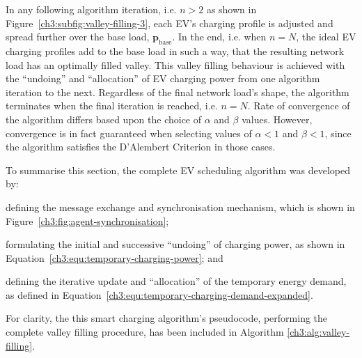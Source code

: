 In any following algorithm iteration, i.e. $n>2$ as shown in Figure~\ref{ch3:subfig:valley-filling-3}, each EV's charging profile is adjusted and spread further over the base load, $\textbf{p}_\text{base}$.
In the end, i.e. when $n=N$, the ideal EV charging profiles add to the base load in such a way, that the resulting network load has an optimally filled valley.
This valley filling behaviour is achieved with the ``undoing'' and ``allocation'' of EV charging power from one algorithm iteration to the next.
Regardless of the final network load's shape, the algorithm terminates when the final iteration is reached, i.e. $n=N$.
Rate of convergence of the algorithm differs based upon the choice of $\alpha$ and $\beta$ values.
However, convergence is in fact guaranteed when selecting values of $\alpha < 1$ and $\beta < 1$, since the algorithm satisfies the D'Alembert Criterion in those cases.

To summarise this section, the complete EV scheduling algorithm was developed by: 
\begin{enumerate*}
	\item defining the message exchange and synchronisation mechanism, which is shown in Figure~\ref{ch3:fig:agent-synchronisation};
	\item formulating the initial and successive ``undoing'' of charging power, as shown in Equation~\ref{ch3:equ:temporary-charging-power}; and
	\item defining the iterative update and ``allocation'' of the temporary energy demand, as defined in Equation~\ref{ch3:equ:temporary-charging-demand-expanded}.
\end{enumerate*}
For clarity, the this smart charging algorithm's pseudocode, performing the complete valley filling procedure, has been included in Algorithm \ref{ch3:alg:valley-filling}.















